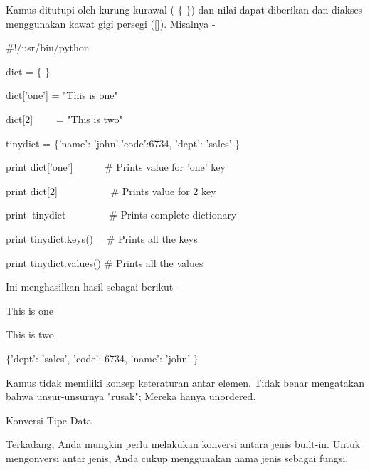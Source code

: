 \vspace{12pt}
\noindent 
Kamus ditutupi oleh kurung kurawal ( $  \{  $ $  \}  $) dan nilai dapat diberikan dan diakses menggunakan kawat gigi persegi ([]). $  $Misalnya - \par
\vspace{12pt}
\noindent 
 $  \#  $!/usr/bin/python \par
\vspace{12pt}
\noindent 
dict =  $  \{  $ $  \}  $ \par
\noindent 
dict['one'] = "This is one" \par
\noindent 
dict[2]~~~~ = "This is two" \par
\vspace{12pt}
\noindent 
tinydict =  $  \{  $'name': 'john','code':6734, 'dept': 'sales' $  \}  $ \par
\vspace{12pt}
\vspace{12pt}
\noindent 
print dict['one']~~ ~~~  $  \#  $ Prints value for 'one' key \par
\noindent 
print dict[2]~~~~~~~~~~  $  \#  $ Prints value for 2 key \par
\noindent 
print~tinydict~~~~~~~~   $  \#  $ Prints complete dictionary \par
\noindent 
print tinydict.keys()~~  $  \#  $ Prints all the keys \par
\noindent 
print tinydict.values()  $  \#  $ Prints all the values \par
\noindent 
Ini menghasilkan hasil sebagai berikut - \par
\noindent 
This is one \par
\noindent 
This is two \par
\noindent 
 $  \{  $'dept': 'sales', 'code': 6734, 'name': 'john' $  \}  $ \par
{} \par
{} \par
\vspace{12pt}
\noindent 
Kamus tidak memiliki konsep keteraturan antar elemen. $  $Tidak benar mengatakan bahwa unsur-unsurnya "rusak"; $  $Mereka hanya unordered. \par
\vspace{12pt}
\noindent 
Konversi Tipe Data \par
\vspace{12pt}
\noindent 
Terkadang, Anda mungkin perlu melakukan konversi antara jenis built-in. $  $Untuk mengonversi antar jenis, Anda cukup menggunakan nama jenis sebagai fungsi. \par
